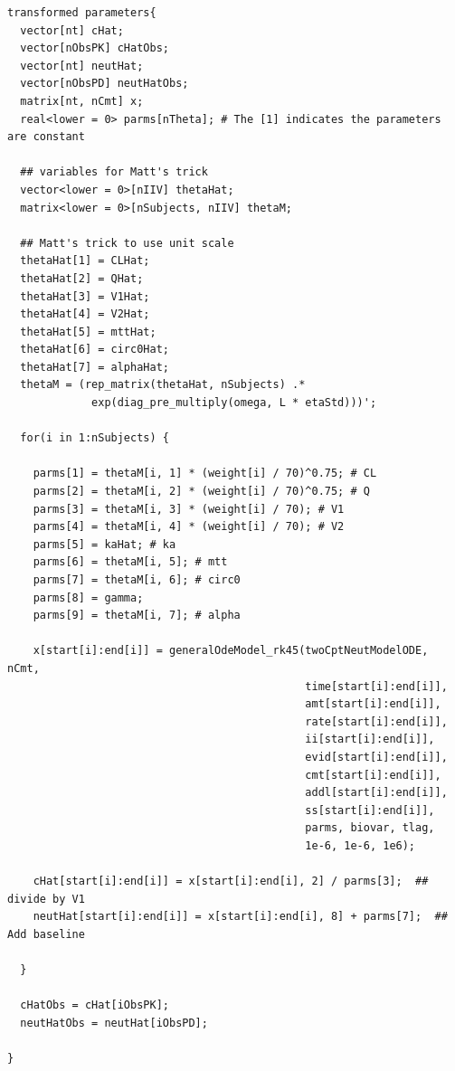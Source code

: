 \documentclass[11pt, reqno, oneside]{amsbook}
\numberwithin{equation}{chapter}
\numberwithin{figure}{chapter}
\numberwithin{table}{chapter}
\theoremstyle{remark}
\begin{document}
\begin{verbatim}
transformed parameters{
  vector[nt] cHat;
  vector[nObsPK] cHatObs;
  vector[nt] neutHat;
  vector[nObsPD] neutHatObs;
  matrix[nt, nCmt] x;
  real<lower = 0> parms[nTheta]; # The [1] indicates the parameters are constant

  ## variables for Matt's trick
  vector<lower = 0>[nIIV] thetaHat;
  matrix<lower = 0>[nSubjects, nIIV] thetaM; 

  ## Matt's trick to use unit scale
  thetaHat[1] = CLHat; 
  thetaHat[2] = QHat;
  thetaHat[3] = V1Hat;
  thetaHat[4] = V2Hat;
  thetaHat[5] = mttHat;
  thetaHat[6] = circ0Hat;
  thetaHat[7] = alphaHat;
  thetaM = (rep_matrix(thetaHat, nSubjects) .* 
             exp(diag_pre_multiply(omega, L * etaStd)))';

  for(i in 1:nSubjects) {

    parms[1] = thetaM[i, 1] * (weight[i] / 70)^0.75; # CL
    parms[2] = thetaM[i, 2] * (weight[i] / 70)^0.75; # Q
    parms[3] = thetaM[i, 3] * (weight[i] / 70); # V1
    parms[4] = thetaM[i, 4] * (weight[i] / 70); # V2
    parms[5] = kaHat; # ka
    parms[6] = thetaM[i, 5]; # mtt
    parms[7] = thetaM[i, 6]; # circ0
    parms[8] = gamma;
    parms[9] = thetaM[i, 7]; # alpha

    x[start[i]:end[i]] = generalOdeModel_rk45(twoCptNeutModelODE, nCmt,
                                              time[start[i]:end[i]], 
                                              amt[start[i]:end[i]], 
                                              rate[start[i]:end[i]], 
                                              ii[start[i]:end[i]], 
                                              evid[start[i]:end[i]], 
                                              cmt[start[i]:end[i]], 
                                              addl[start[i]:end[i]], 
                                              ss[start[i]:end[i]],
                                              parms, biovar, tlag,
                                              1e-6, 1e-6, 1e6);

    cHat[start[i]:end[i]] = x[start[i]:end[i], 2] / parms[3];  ## divide by V1
    neutHat[start[i]:end[i]] = x[start[i]:end[i], 8] + parms[7];  ## Add baseline

  }

  cHatObs = cHat[iObsPK];
  neutHatObs = neutHat[iObsPD];

}
\end{verbatim}
\end{document}
